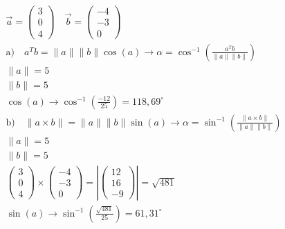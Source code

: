 \documentclass[a4paper]{article}
\begin{document}
  \subsection{}
    \begin{align*}
      \vec{a} =
      \begin{pmatrix}
        3 \\ 0 \\ 4
      \end{pmatrix}
      \quad
      \vec{b} =
      \begin{pmatrix}
        -4 \\ -3 \\ 0
      \end{pmatrix}
      \\[1em]
      \text{a)}\quad a^Tb = \|a\|\|b\|\cos{(a)}\rightarrow \alpha = \cos^{-1} (\frac{a^Tb}{\|a\|\|b\|}) \\[1em]
      \|a\| = 5 \\[1em]
      \|b\| = 5 \\[1em]
      \cos{(a)} \rightarrow \cos^{-1}(\frac{-12}{25}) = 118,69^\circ
      \\[1em]
      \text{b)}\quad \|a \times b\| = \|a\|\|b\|\sin{(a)}\rightarrow \alpha = \sin^{-1} (\frac{\|a \times b\|}{\|a\|\|b\|}) \\[1em]
      \|a\| = 5 \\[1em]
      \|b\| = 5 \\[1em]
      \begin{pmatrix}
        3 \\ 0 \\ 4
      \end{pmatrix}
      \times
      \begin{pmatrix}
        -4 \\ -3 \\ 0
      \end{pmatrix}
      =
      \left|\begin{pmatrix}
        12 \\ 16 \\ -9
      \end{pmatrix}\right|
      = \sqrt{481}
      \\[1em]
      \sin{(a)} \rightarrow \sin^{-1}(\frac{\sqrt{481}}{25}) = 61,31^\circ
    \end{align*}
\end{document}
